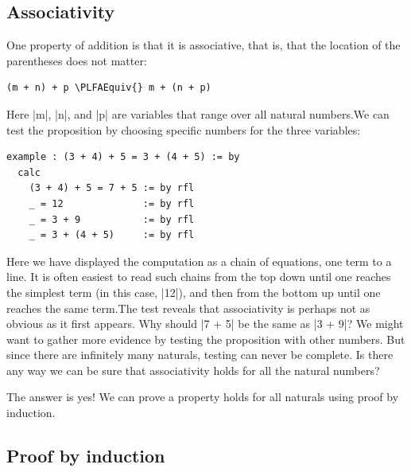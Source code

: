 \documentclass{memoir}
\newcommand{\PLFAEquiv}{\ensuremath{\equiv}}
\begin{document}
\par

\subsection{Associativity}\label{PLFA--in--Lean----Part--1----Induction-005F-005F-005F--Proof--by--Induction----Associativity}

\par
One property of addition is that it is associative, that is, that the location
of the parentheses does not matter:

\par
\par\noindent \begin{verbatim}
(m + n) + p \PLFAEquiv{} m + (n + p)
\end{verbatim}
Here \LeanVerb|m|, \LeanVerb|n|, and \LeanVerb|p| are variables that range over all natural numbers.We can test the proposition by choosing specific numbers for the three variables:\begin{verbatim}
example : (3 + 4) + 5 = 3 + (4 + 5) := by
  calc
    (3 + 4) + 5 = 7 + 5 := by rfl
    _ = 12              := by rfl
    _ = 3 + 9           := by rfl
    _ = 3 + (4 + 5)     := by rfl
\end{verbatim}
Here we have displayed the computation as a chain of equations, one term to a
line. It is often easiest to read such chains from the top down until one
reaches the simplest term (in this case, \LeanVerb|12|), and then from the bottom up
until one reaches the same term.The test reveals that associativity is perhaps not as obvious as it first
appears. Why should \LeanVerb|7 + 5| be the same as \LeanVerb|3 + 9|? We might want to gather
more evidence by testing the proposition with other numbers. But since there
are infinitely many naturals, testing can never be complete. Is there any way
we can be sure that associativity holds for all the natural numbers?

\par
\par\noindent The answer is yes! We can prove a property holds for all naturals using proof by induction.

\par

\subsection{Proof by induction}\label{PLFA--in--Lean----Part--1----Induction-005F-005F-005F--Proof--by--Induction----Proof--by--induction}
\end{document}
